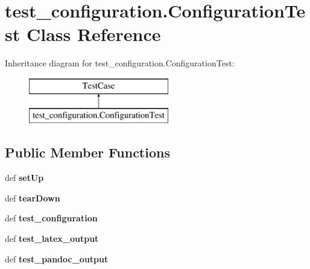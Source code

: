 \hypertarget{classtest__configuration_1_1_configuration_test}{\section{test\-\_\-configuration.\-Configuration\-Test Class Reference}
\label{classtest__configuration_1_1_configuration_test}
}
Inheritance diagram for test\-\_\-configuration.\-Configuration\-Test\-:\begin{figure}[H]
\begin{center}
\leavevmode
\includegraphics[height=2.000000cm]{classtest__configuration_1_1_configuration_test}
\end{center}
\end{figure}
\subsection*{Public Member Functions}
\begin{DoxyCompactItemize}
\item 
\hypertarget{classtest__configuration_1_1_configuration_test_ad469b92cd21087bdce65770727628c58}{def {\bfseries set\-Up}}\label{classtest__configuration_1_1_configuration_test_ad469b92cd21087bdce65770727628c58}

\item 
\hypertarget{classtest__configuration_1_1_configuration_test_aff4b1244aa951499069307cc282401e2}{def {\bfseries tear\-Down}}\label{classtest__configuration_1_1_configuration_test_aff4b1244aa951499069307cc282401e2}

\item 
\hypertarget{classtest__configuration_1_1_configuration_test_a3a77773b5cb19ef4a090c77ed9017fd6}{def {\bfseries test\-\_\-configuration}}\label{classtest__configuration_1_1_configuration_test_a3a77773b5cb19ef4a090c77ed9017fd6}

\item 
\hypertarget{classtest__configuration_1_1_configuration_test_a7b47ad52641e965723f4d68cffa1bd12}{def {\bfseries test\-\_\-latex\-\_\-output}}\label{classtest__configuration_1_1_configuration_test_a7b47ad52641e965723f4d68cffa1bd12}

\item 
\hypertarget{classtest__configuration_1_1_configuration_test_ab2abe2b5082506f29f1d2dd3ae2e636b}{def {\bfseries test\-\_\-pandoc\-\_\-output}}\label{classtest__configuration_1_1_configuration_test_ab2abe2b5082506f29f1d2dd3ae2e636b}

\end{DoxyCompactItemize}
